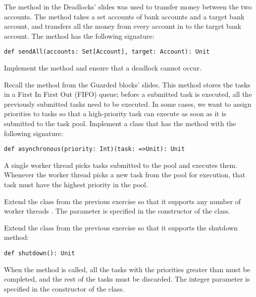 \documentclass[11pt]{article}
\begin{document}
\begin{myExercise}The  method in the Deadlocks' slides was used to transfer money between the two accounts. The  method takes a set accounts of bank accounts and a target bank account, and transfers all the money from every account in  to the target bank account. The  method has the following signature:
\begin{lstlisting}
def sendAll(accounts: Set[Account], target: Account): Unit
\end{lstlisting}
Implement the  method and ensure that a deadlock cannot occur.
\end{myExercise}

\begin{myExercise}Recall the  method from the Guarded blocks' slides. This method stores the tasks in a First In First Out (FIFO) queue; before a submitted task is executed, all the previously submitted tasks need to be executed. In some cases, we want to assign priorities to tasks so that a high-priority task can execute as soon as it is submitted to the task pool. Implement a  class that has the  method with the following signature:
\begin{lstlisting}
def asynchronous(priority: Int)(task: =>Unit): Unit
\end{lstlisting}
A single worker thread picks tasks submitted to the pool and executes them. Whenever the worker thread picks a new task from the pool for execution, that task must have the highest priority in the pool.
\end{myExercise}

\begin{myExercise}Extend the  class from the previous exercise so that it supports any number of worker threads . The parameter  is specified in the constructor of the  class.
\end{myExercise}

\begin{myExercise}Extend the  class from the previous exercise so that it supports the shutdown method:
\begin{lstlisting}
def shutdown(): Unit
\end{lstlisting}
When the  method is called, all the tasks with the priorities greater than  must be completed, and the rest of the tasks must be discarded. The  integer parameter is specified in the constructor of the  class.
\end{myExercise}
\end{document}
